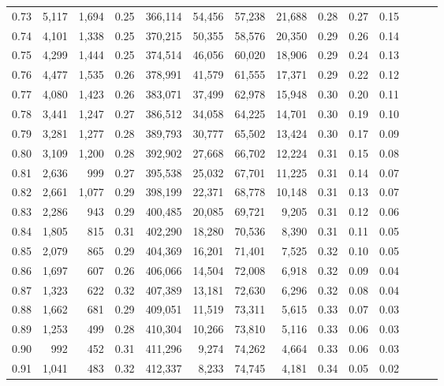 \begin{tabular}{rrrrrrrrrrrrrr}
0.73 &  5,117 &  1,694 &  0.25 &  366,114 &   54,456 &  57,238 &  21,688 &  0.28 &  0.27 &      0.15 \\
0.74 &  4,101 &  1,338 &  0.25 &  370,215 &   50,355 &  58,576 &  20,350 &  0.29 &  0.26 &      0.14 \\
0.75 &  4,299 &  1,444 &  0.25 &  374,514 &   46,056 &  60,020 &  18,906 &  0.29 &  0.24 &      0.13 \\
0.76 &  4,477 &  1,535 &  0.26 &  378,991 &   41,579 &  61,555 &  17,371 &  0.29 &  0.22 &      0.12 \\
0.77 &  4,080 &  1,423 &  0.26 &  383,071 &   37,499 &  62,978 &  15,948 &  0.30 &  0.20 &      0.11 \\
0.78 &  3,441 &  1,247 &  0.27 &  386,512 &   34,058 &  64,225 &  14,701 &  0.30 &  0.19 &      0.10 \\
0.79 &  3,281 &  1,277 &  0.28 &  389,793 &   30,777 &  65,502 &  13,424 &  0.30 &  0.17 &      0.09 \\
0.80 &  3,109 &  1,200 &  0.28 &  392,902 &   27,668 &  66,702 &  12,224 &  0.31 &  0.15 &      0.08 \\
0.81 &  2,636 &    999 &  0.27 &  395,538 &   25,032 &  67,701 &  11,225 &  0.31 &  0.14 &      0.07 \\
0.82 &  2,661 &  1,077 &  0.29 &  398,199 &   22,371 &  68,778 &  10,148 &  0.31 &  0.13 &      0.07 \\
0.83 &  2,286 &    943 &  0.29 &  400,485 &   20,085 &  69,721 &   9,205 &  0.31 &  0.12 &      0.06 \\
0.84 &  1,805 &    815 &  0.31 &  402,290 &   18,280 &  70,536 &   8,390 &  0.31 &  0.11 &      0.05 \\
0.85 &  2,079 &    865 &  0.29 &  404,369 &   16,201 &  71,401 &   7,525 &  0.32 &  0.10 &      0.05 \\
0.86 &  1,697 &    607 &  0.26 &  406,066 &   14,504 &  72,008 &   6,918 &  0.32 &  0.09 &      0.04 \\
0.87 &  1,323 &    622 &  0.32 &  407,389 &   13,181 &  72,630 &   6,296 &  0.32 &  0.08 &      0.04 \\
0.88 &  1,662 &    681 &  0.29 &  409,051 &   11,519 &  73,311 &   5,615 &  0.33 &  0.07 &      0.03 \\
0.89 &  1,253 &    499 &  0.28 &  410,304 &   10,266 &  73,810 &   5,116 &  0.33 &  0.06 &      0.03 \\
0.90 &    992 &    452 &  0.31 &  411,296 &    9,274 &  74,262 &   4,664 &  0.33 &  0.06 &      0.03 \\
0.91 &  1,041 &    483 &  0.32 &  412,337 &    8,233 &  74,745 &   4,181 &  0.34 &  0.05 &      0.02 \\

\end{tabular}
